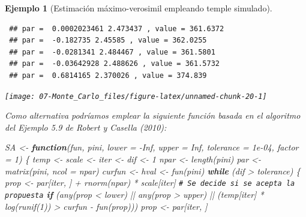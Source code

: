 \documentclass[
]{book}
\newenvironment{Shaded}{\begin{snugshade}}{\end{snugshade}}
\newcommand{\AttributeTok}[1]{\textcolor[rgb]{0.77,0.63,0.00}{#1}}
\newcommand{\CommentTok}[1]{\textcolor[rgb]{0.56,0.35,0.01}{\textit{#1}}}
\newcommand{\ConstantTok}[1]{\textcolor[rgb]{0.00,0.00,0.00}{#1}}
\newcommand{\ControlFlowTok}[1]{\textcolor[rgb]{0.13,0.29,0.53}{\textbf{#1}}}
\newcommand{\DecValTok}[1]{\textcolor[rgb]{0.00,0.00,0.81}{#1}}
\newcommand{\FloatTok}[1]{\textcolor[rgb]{0.00,0.00,0.81}{#1}}
\newcommand{\FunctionTok}[1]{\textcolor[rgb]{0.00,0.00,0.00}{#1}}
\newcommand{\NormalTok}[1]{#1}
\newcommand{\OtherTok}[1]{\textcolor[rgb]{0.56,0.35,0.01}{#1}}
\newcommand{\SpecialCharTok}[1]{\textcolor[rgb]{0.00,0.00,0.00}{#1}}
\theoremstyle{break}
\newtheorem{example}{Ejemplo}[chapter]
\theoremstyle{nonumberplain}
\renewcommand{\CommentTok}[1]{\textcolor[rgb]{0.41,0.41,0.41}{\texttt{#1}}}
\begin{document}
\begin{example}[Estimación máximo-verosimil empleando temple simulado]
\begin{verbatim}
 ## par =  0.0002023461 2.473437 , value = 361.6372 
 ## par =  -0.182735 2.45585 , value = 362.0255 
 ## par =  -0.0281341 2.484467 , value = 361.5801 
 ## par =  -0.03642928 2.488626 , value = 361.5732 
 ## par =  0.6814165 2.370026 , value = 374.839
\end{verbatim}

\begin{center}\texttt{[image: 07-Monte\_Carlo\_files/figure-latex/unnamed-chunk-20-1]} \end{center}

Como alternativa podríamos emplear la siguiente función basada en el algoritmo del Ejemplo 5.9 de Robert y Casella (2010):

\begin{Shaded}
\begin{Highlighting}[]
\NormalTok{SA }\OtherTok{\textless{}{-}} \ControlFlowTok{function}\NormalTok{(fun, pini, }\AttributeTok{lower =} \SpecialCharTok{{-}}\ConstantTok{Inf}\NormalTok{, }\AttributeTok{upper =} \ConstantTok{Inf}\NormalTok{, }\AttributeTok{tolerance =} \FloatTok{1e{-}04}\NormalTok{, }\AttributeTok{factor =} \DecValTok{1}\NormalTok{) \{}
\NormalTok{  temp }\OtherTok{\textless{}{-}}\NormalTok{ scale }\OtherTok{\textless{}{-}}\NormalTok{ iter }\OtherTok{\textless{}{-}}\NormalTok{ dif }\OtherTok{\textless{}{-}} \DecValTok{1}
\NormalTok{  npar }\OtherTok{\textless{}{-}} \FunctionTok{length}\NormalTok{(pini) }
\NormalTok{  par }\OtherTok{\textless{}{-}} \FunctionTok{matrix}\NormalTok{(pini, }\AttributeTok{ncol =}\NormalTok{ npar)}
\NormalTok{  curfun }\OtherTok{\textless{}{-}}\NormalTok{ hval }\OtherTok{\textless{}{-}} \FunctionTok{fun}\NormalTok{(pini)}
  \ControlFlowTok{while}\NormalTok{ (dif }\SpecialCharTok{\textgreater{}}\NormalTok{ tolerance) \{}
\NormalTok{    prop }\OtherTok{\textless{}{-}}\NormalTok{ par[iter, ] }\SpecialCharTok{+} \FunctionTok{rnorm}\NormalTok{(npar) }\SpecialCharTok{*}\NormalTok{ scale[iter]}
    \CommentTok{\# Se decide si se acepta la propuesta}
    \ControlFlowTok{if}\NormalTok{ (}\FunctionTok{any}\NormalTok{(prop }\SpecialCharTok{\textless{}}\NormalTok{ lower) }\SpecialCharTok{||} \FunctionTok{any}\NormalTok{(prop }\SpecialCharTok{\textgreater{}}\NormalTok{ upper) }\SpecialCharTok{||} 
\NormalTok{        (temp[iter] }\SpecialCharTok{*} \FunctionTok{log}\NormalTok{(}\FunctionTok{runif}\NormalTok{(}\DecValTok{1}\NormalTok{)) }\SpecialCharTok{\textgreater{}}\NormalTok{ curfun }\SpecialCharTok{{-}} \FunctionTok{fun}\NormalTok{(prop)))  prop }\OtherTok{\textless{}{-}}\NormalTok{ par[iter, ]}

\end{Highlighting}
\end{Shaded}
\end{example}
\end{document}
